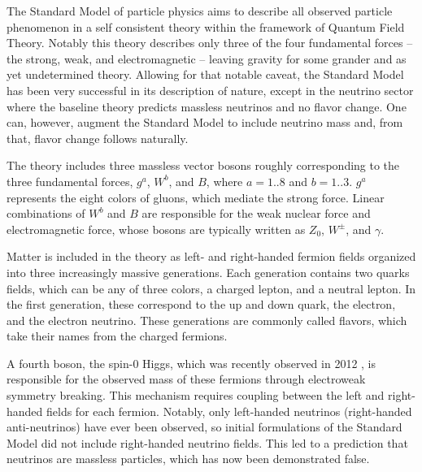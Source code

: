 The Standard Model of particle physics aims to describe all observed particle phenomenon in a self consistent theory within the framework of Quantum Field Theory.
Notably this theory describes only three of the four fundamental forces -- the strong, weak, and electromagnetic -- leaving gravity for some grander and as yet undetermined theory. 
Allowing for that notable caveat, the Standard Model has been very successful in its description of nature, except in the neutrino sector where the baseline theory predicts massless neutrinos and no flavor change.
One can, however, augment the Standard Model to include neutrino mass and, from that, flavor change follows naturally.

The theory includes three massless vector bosons roughly corresponding to the three fundamental forces, $g^a$, $W^b$, and $B$, where $a=1..8$ and $b=1..3$.
$g^a$ represents the eight colors of gluons, which mediate the strong force.
Linear combinations of $W^b$ and $B$ are responsible for the weak nuclear force and electromagnetic force, whose bosons are typically written as $Z_0$, $W^{\pm}$, and $\gamma$.

Matter is included in the theory as left- and right-handed fermion fields organized into three increasingly massive generations.
Each generation contains two quarks fields, which can be any of three colors, a charged lepton, and a neutral lepton.
In the first generation, these correspond to the up and down quark, the electron, and the electron neutrino. 
These generations are commonly called flavors, which take their names from the charged fermions.

A fourth boson, the spin-0 Higgs, which was recently observed in 2012 \cite{higgs}, is responsible for the observed mass of these fermions through electroweak symmetry breaking.
This mechanism requires coupling between the left and right-handed fields for each fermion.
Notably, only left-handed neutrinos (right-handed anti-neutrinos) have ever been observed, so initial formulations of the Standard Model did not include right-handed neutrino fields.
This led to a prediction that neutrinos are massless particles, which has now been demonstrated false.

